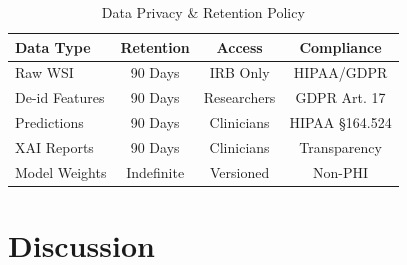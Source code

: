 \documentclass[11pt,a4paper]{article}
\begin{document}
\begin{table}[H]
\centering
\caption{Data Privacy \& Retention Policy}
\small
\begin{tabular}{|l|c|c|c|}
\hline
\textbf{Data Type} & \textbf{Retention} & \textbf{Access} & \textbf{Compliance} \\
\hline
Raw WSI & 90 Days & IRB Only & HIPAA/GDPR \\
De-id Features & 90 Days & Researchers & GDPR Art. 17 \\
Predictions & 90 Days & Clinicians & HIPAA §164.524 \\
XAI Reports & 90 Days & Clinicians & Transparency \\
Model Weights & Indefinite & Versioned & Non-PHI \\
\hline
\end{tabular}
\label{tab:privacy_policy}
\end{table}

%
%
\section{Discussion}
\label{sec:discussion}
\end{document}
